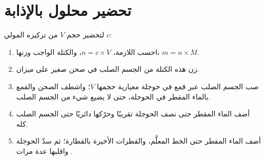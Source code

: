 \section{تحضير محلول بالإذابة}

\begin{method}\label{met:g10:concentration-and-dilution:dissolving}
لتحضير حجم $V$ من  تركيزه المولي $c$:
\begin{enumerate}
  \item احسب  اللازمة، $n = c \times V$، والكتلة الواجب
        وزنها، $m = n \times M$.
  \item زن هذه الكتلة من الجسم الصلب في صحن صغير على ميزان.
  \item صب الجسم الصلب عبر قمع في حوجلة معيارية حجمها
        $V$؛ واشطف الصحن والقمع بالماء المقطر في الحوجلة، حتى لا
        يضيع شيء من الجسم الصلب.
  \item أضف الماء المقطر حتى نصف الحوجلة تقريبًا وحرّكها دائريًا حتى
         الجسم الصلب كله.
  \item أضف الماء المقطر حتى الخط المعلَّم، والقطرات الأخيرة بالقطارة؛
        ثم سدّ الحوجلة واقلبها عدة مرات .
\end{enumerate}
\end{method}

